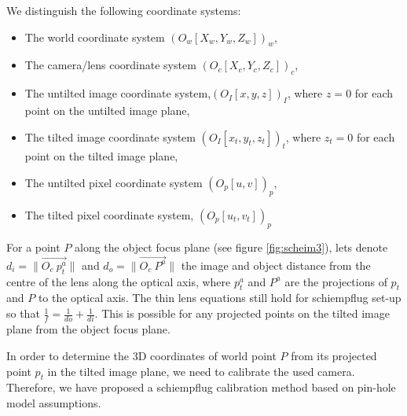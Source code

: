 \documentclass[12pt]{article}
\begin{document}
We distinguish the following coordinate systems:
\begin{itemize}
\item  The world coordinate system $(O_w[X_{w},Y_{w},Z_{w}])_w$,
\item  The camera/lens coordinate system $(O_c[X_{c},Y_{c},Z_{c}])_c$,
\item  The untilted image coordinate system,$(O_I[x,y,z])_I$, where $z=0$ for each point on the untilted image plane,
\item  The tilted image coordinate system $(O_I[x_{t},y_{t},z_{t}])_t$, where $z_t=0$ for each point on the tilted image plane, 
\item  The untilted pixel coordinate system $(O_p[u,v])_p$, 
\item  The tilted pixel coordinate system, $(O_p[u_t,v_t])_p$
\end{itemize}





For a point $P$ along the object focus plane (see figure \ref{fig:scheim3}), lets denote $d_{i}= \|\vec {O_c~p_t^a}\|$ and $d_{o}= \|\vec {O_c~P^a}\|$ the image and object distance from the centre of the lens along the optical axis, where $p_t^a$ and $P^a$ are the projections of $p_t$ and $P$ to the optical axis.  The thin lens equations still hold for schiempflug set-up so that $\frac{1}{f}=\frac{1}{do}+\frac{1}{di}$. This is possible for any projected points on the tilted image plane from the object focus plane.  




In order to determine the 3D coordinates of world point $P$ from its projected point $p_t$ in the tilted image plane, we need to calibrate the used camera. Therefore, we have proposed a schiempflug calibration method based on pin-hole model assumptions. 


\end{document}
